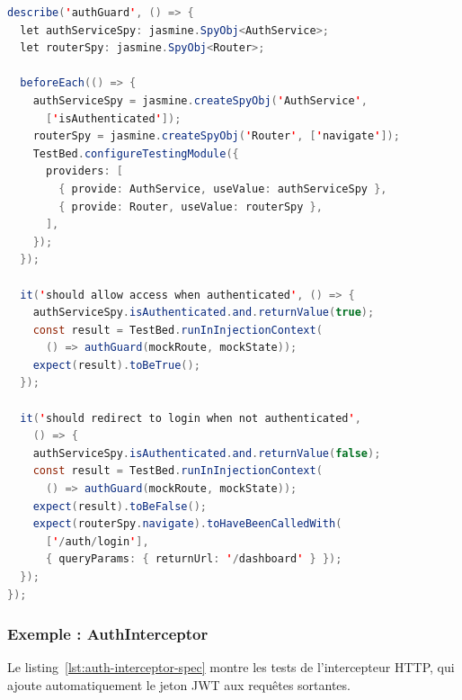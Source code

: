 \begin{lstlisting}[language=Java, caption={Test du garde d'authentification -- auth.guard.spec.ts}, label={lst:auth-guard-spec}]
describe('authGuard', () => {
  let authServiceSpy: jasmine.SpyObj<AuthService>;
  let routerSpy: jasmine.SpyObj<Router>;

  beforeEach(() => {
    authServiceSpy = jasmine.createSpyObj('AuthService',
      ['isAuthenticated']);
    routerSpy = jasmine.createSpyObj('Router', ['navigate']);
    TestBed.configureTestingModule({
      providers: [
        { provide: AuthService, useValue: authServiceSpy },
        { provide: Router, useValue: routerSpy },
      ],
    });
  });

  it('should allow access when authenticated', () => {
    authServiceSpy.isAuthenticated.and.returnValue(true);
    const result = TestBed.runInInjectionContext(
      () => authGuard(mockRoute, mockState));
    expect(result).toBeTrue();
  });

  it('should redirect to login when not authenticated',
    () => {
    authServiceSpy.isAuthenticated.and.returnValue(false);
    const result = TestBed.runInInjectionContext(
      () => authGuard(mockRoute, mockState));
    expect(result).toBeFalse();
    expect(routerSpy.navigate).toHaveBeenCalledWith(
      ['/auth/login'],
      { queryParams: { returnUrl: '/dashboard' } });
  });
});
\end{lstlisting}

\subsubsection{Exemple : AuthInterceptor}

Le listing~\ref{lst:auth-interceptor-spec} montre les tests de l'intercepteur HTTP,
qui ajoute automatiquement le jeton JWT aux requêtes sortantes.

